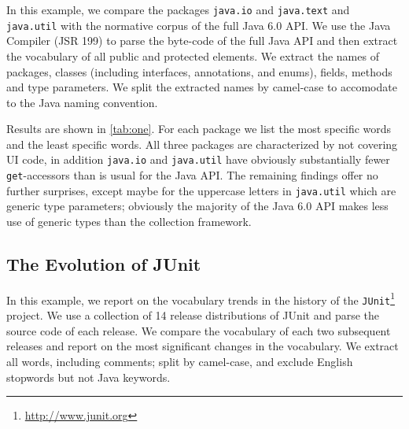 In this example, we compare the packages \verb$java.io$ and \verb$java.text$ and \verb$java.util$ with the normative corpus of the full Java 6.0 API. We use the Java Compiler (JSR 199) to parse the byte-code of the full Java API and then extract the vocabulary of all public and protected elements. We extract the names of packages, classes (including interfaces, annotations, and enums), fields, methods and type parameters. We split the extracted names by camel-case to accomodate to the Java naming convention.

Results are shown in \autoref{tab:one}. For each package we list the most specific words and the least specific words. All three packages are characterized by not covering UI code, in addition \verb$java.io$ and \verb$java.util$ have obviously substantially fewer \verb$get$-accessors than is usual for the Java API. The remaining findings offer no further surprises, except maybe for the uppercase letters in \verb$java.util$ which are generic type parameters; obviously the majority of the Java 6.0 API makes less use of generic types than the collection framework.



\subsection{The Evolution of JUnit}\label{example3}

In this example, we report on the vocabulary trends in the history of the \verb$JUnit$\footnote{\url{http://www.junit.org}} project. We use a collection of 14 release distributions of JUnit and parse the source code of each release.  We compare the vocabulary of each two subsequent releases and report on the most significant changes in the vocabulary. We extract all words, including comments; split by camel-case, and exclude English stopwords but not Java keywords.

